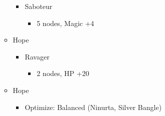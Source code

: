 \begin{menu}
\begin{itemize}
\begin{itemize}
\begin{itemize}
					      \item Saboteur
					            \begin{itemize}
						            \item 5 nodes, Magic +4
					            \end{itemize}
				      \end{itemize}
				\item Hope
				      \begin{itemize}
					      \item Ravager
					            \begin{itemize}
						            \item 2 nodes, HP +20
					            \end{itemize}
				      \end{itemize}
			\end{itemize}
			\equip
			\begin{itemize}
				\item Hope
				      \begin{itemize}
					      \item Optimize: Balanced (Ninurta, Silver Bangle)
				      \end{itemize}
			\end{itemize}
		\end{itemize}
	\end{menu}

	\renewcommand{\first}{[1] Relentless Assault (\rav/\com/\rav)}
	\renewcommand{\second}{[2] Bully (\syn/\com/\sab)}
	\renewcommand{\third}{[3] Relentless Assault (\rav/\com/\rav)}
	\renewcommand{\fourth}{[4] Smart Bomb (\rav/\rav/\sab)}
	\renewcommand{\fifth}{[5] Tri-Disaster (\rav/\rav/\rav)}
	\renewcommand{\sixth}{[6] Malevolence (\syn/\rav/\rav)}


